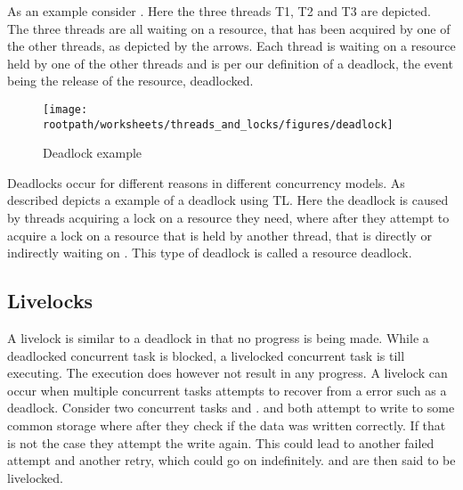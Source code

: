 As an example consider . Here the three threads T1, T2 and T3 are depicted. The three threads are all waiting on a resource, that has been acquired by one of the other threads, as depicted by the arrows. Each thread is waiting on a resource held by one of the other threads and is per our definition of a deadlock, the event being the release of the resource, deadlocked.
\begin{figure}[htbp]
\centering
 \texttt{[image: \\rootpath/worksheets/threads\_and\_locks/figures/deadlock]} 
 \caption{Deadlock example}
\label{fig:deadlockexample}
\end{figure}

Deadlocks occur for different reasons in different concurrency models. As described  depicts a example of a deadlock using \ac{TL}. Here the deadlock is caused by threads acquiring a lock on a resource they need, where after they attempt to acquire a lock on a resource that is held by another thread, that is directly or indirectly waiting on . This type of deadlock is called a resource deadlock\cite[p. 435]{tanenbaum2008modern}. 


\subsection{Livelocks} A livelock is similar to a deadlock in that no progress is being made. While a deadlocked concurrent task is blocked, a livelocked concurrent task is till executing. The execution does however not result in any progress. A livelock can occur when multiple concurrent tasks attempts to recover from a error such as a deadlock\cite[p. 457]{tanenbaum2008modern}. Consider two concurrent tasks  and .  and  both attempt to write to some common storage where after they check if the data was written correctly. If that is not the case they attempt the write again. This could lead to another failed attempt and another retry, which could go on indefinitely.  and  are then said to be livelocked.

